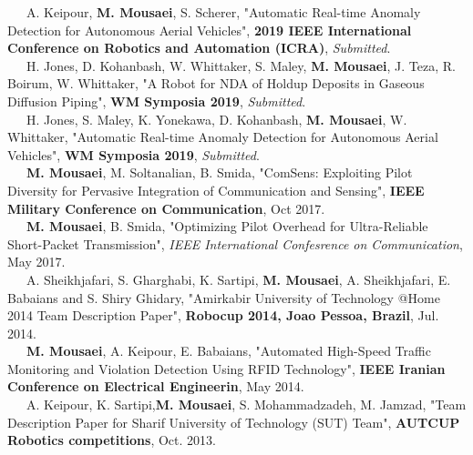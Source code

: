 

\bullet ~~~A. Keipour, \textbf{M. Mousaei}, S. Scherer, "Automatic Real-time Anomaly Detection for Autonomous Aerial Vehicles", \textbf{2019 IEEE International Conference on Robotics and Automation (ICRA)}, \textit{Submitted}. \\
\bullet ~~~H. Jones, D. Kohanbash, W. Whittaker, S. Maley, \textbf{M. Mousaei}, J. Teza, R. Boirum, W. Whittaker, "A Robot for NDA of Holdup Deposits in Gaseous Diffusion Piping", \textbf{WM Symposia 2019}, \textit{Submitted}. \\
\bullet ~~~H. Jones, S. Maley, K. Yonekawa, D. Kohanbash, \textbf{M. Mousaei}, W. Whittaker, "Automatic Real-time Anomaly Detection for Autonomous Aerial Vehicles", \textbf{WM Symposia 2019}, \textit{Submitted}. \\
\bullet ~~~\textbf{M. Mousaei}, M. Soltanalian, B. Smida, "ComSens: Exploiting Pilot Diversity for Pervasive Integration of Communication and Sensing", \textbf{IEEE Military Conference on Communication}, Oct 2017. \\
\bullet ~~~\textbf{M. Mousaei}, B. Smida, "Optimizing Pilot Overhead for Ultra-Reliable Short-Packet Transmission", \textit{IEEE International Confesrence on Communication}, May 2017. \\
\bullet ~~~A. Sheikhjafari, S. Gharghabi, K. Sartipi, \textbf{M. Mousaei}, A. Sheikhjafari, E. Babaians and S. Shiry Ghidary, "Amirkabir University of Technology @Home 2014 Team Description Paper", \textbf{Robocup 2014, Joao Pessoa, Brazil}, Jul. 2014.\\
\bullet ~~~\textbf{M. Mousaei}, A. Keipour, E. Babaians, "Automated High-Speed Traffic Monitoring and Violation Detection Using RFID Technology", \textbf{IEEE Iranian Conference on Electrical Engineerin}, May 2014. \\
\bullet ~~~A. Keipour, K. Sartipi,\textbf{M. Mousaei}, S. Mohammadzadeh, M. Jamzad, "Team Description Paper for Sharif University of Technology (SUT) Team", \textbf{AUTCUP Robotics competitions}, Oct. 2013.\\


\vspace{0.01cm}